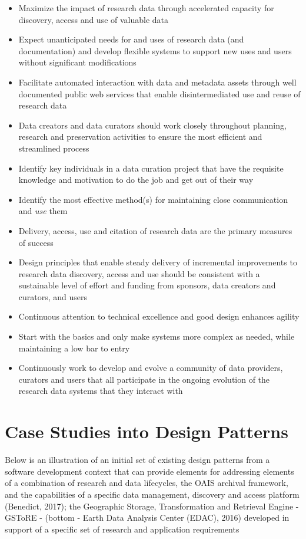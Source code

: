 \documentclass[final]{beamer}
\providecommand{\tightlist}{%
  \setlength{\itemsep}{0pt}\setlength{\parskip}{0pt}}
\begin{document}
\begin{frame}[t]
\begin{multicols}{2}
\begin{itemize}
\tightlist
\item
  Maximize the impact of research data through accelerated capacity for
  discovery, access and use of valuable data
\item
  Expect unanticipated needs for and uses of research data (and
  documentation) and develop flexible systems to support new uses and
  users without significant modifications
\item
  Facilitate automated interaction with data and metadata assets through
  well documented public web services that enable disintermediated use
  and reuse of research data
\item
  Data creators and data curators should work closely throughout
  planning, research and preservation activities to ensure the most
  efficient and streamlined process
\item
  Identify key individuals in a data curation project that have the
  requisite knowledge and motivation to do the job and get out of their
  way
\item
  Identify the most effective method(s) for maintaining close
  communication and \emph{use} them
\item
  Delivery, access, use and citation of research data are the primary
  measures of success
\item
  Design principles that enable steady delivery of incremental
  improvements to research data discovery, access and use should be
  consistent with a sustainable level of effort and funding from
  sponsors, data creators and curators, and users
\item
  Continuous attention to technical excellence and good design enhances
  agility
\item
  Start with the basics and only make systems more complex as needed,
  while maintaining a low bar to entry
\item
  Continuously work to develop and evolve a community of data providers,
  curators and users that all participate in the ongoing evolution of
  the research data systems that they interact with
\end{itemize}

\section{Case Studies into Design
Patterns}\label{case-studies-into-design-patterns}

Below is an illustration of an initial set of existing design patterns
from a software development context that can provide elements for
addressing elements of a combination of research and data lifecycles,
the OAIS archival framework, and the capabilities of a specific data
management, discovery and access platform (Benedict, 2017); the
Geographic Storage, Transformation and Retrieval Engine - GSToRE -
(bottom - Earth Data Analysis Center (EDAC), 2016) developed in support
of a specific set of research and application requirements


\end{multicols}
\end{frame}
\end{document}
